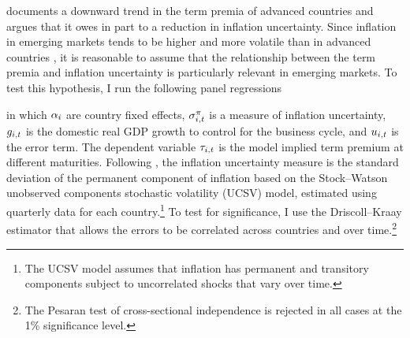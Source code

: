 {\cite{Wright:2011} documents a downward trend in the term premia of advanced countries and argues that it
owes in part to a reduction in inflation uncertainty.
Since inflation in emerging markets tends to be higher and more volatile than in advanced countries \citep{HaKoseOhnsorge:2019}, it is reasonable to assume that the relationship between the term premia and inflation uncertainty is particularly %
relevant in emerging markets. %
To test this hypothesis, I run the following panel regressions 

\noindent in which \(\alpha_{i}\) are country fixed effects, \(\sigma^{\pi}_{i,t}\) is a measure of inflation uncertainty,
\(g_{i,t}\) is the domestic real GDP growth to control for the business cycle, 
and \(u_{i,t}\) is the error term. 
The dependent variable \(\tau_{i,t}\) is the model implied term premium at different maturities.
Following \cite{Wright:2011}, the inflation uncertainty measure is the standard deviation of the permanent component of inflation based on the Stock--Watson unobserved components stochastic volatility (UCSV) model, estimated using quarterly data for each country.\footnote{ The UCSV model assumes that inflation has permanent and transitory components subject to uncorrelated shocks that vary over time.}
To test for significance, I use the Driscoll--Kraay estimator that allows the errors to be correlated across countries and over time.\footnote{ The Pesaran test of cross-sectional independence is rejected in all cases at the 1\% significance level.}

}
